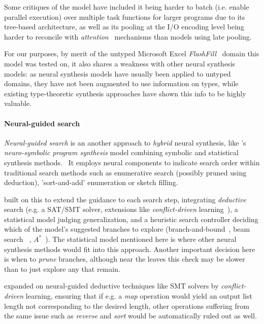 \documentclass{article}
\begin{document}

Some critiques of the model have included it being harder to batch (i.e. enable parallel execution) over multiple task functions for larger programs due to its tree-based architecture,
as well as its pooling at the I/O encoding level being harder to reconcile with \emph{attention}~\citep{bahdanau2014neural} mechanisms than models using late pooling.~\citep{devlin2017robustfill}

For our purposes, by merit of the untyped Microsoft Excel \emph{FlashFill}~\citep{prose} domain this model was tested on,
it also shares a weakness with other neural synthesis models:
as neural synthesis models have usually been applied to untyped domains,
they have not been augmented to use information on types,
while existing type-theoretic synthesis approaches have shown this info to be highly valuable.

\paragraph{Neural-guided search} \label{sec:ngs}

\emph{Neural-guided search} is an another approach to \emph{hybrid} neural synthesis,
like \citet{nsps}'s \emph{neuro-symbolic program synthesis} model combining symbolic and statistical synthesis methods.~\citep{nps}
It employs neural components to indicate search order within traditional search methods
such as enumerative search (possibly pruned using deduction),
'sort-and-add' enumeration or sketch filling.~\citep{deepcoder}

\citet{kalyan2018neural} built on this to extend the guidance to each search step,
integrating \emph{deductive} search (e.g. a SAT/SMT solver, extensions
like \emph{conflict-driven} learning~\citep{feng2018program}),
a statistical model judging generalization,
and a heuristic search controller deciding which of the model's suggested branches
to explore (branch-and-bound~\citep{kalyan2018neural}, beam search%
~\citep{polosukhin2018neural}, $A^{*}$~\citep{lee2018accelerating}).
The statistical model mentioned here is where other
neural synthesis methods would fit into this approach.
Another important decision here is when to \emph{prune} branches,
although near the leaves this check may be slower
than to just explore any that remain.~\citep{polozov}

\citet{feng2018program} expanded on neural-guided deductive techniques
like SMT solvers by \emph{conflict-driven} learning,
ensuring that if e.g. a \emph{map} operation would yield an
output list length not corresponding to the desired length,
other operations suffering from the same issue such as
\emph{reverse} and \emph{sort} would be automatically ruled out as well.
\end{document}
